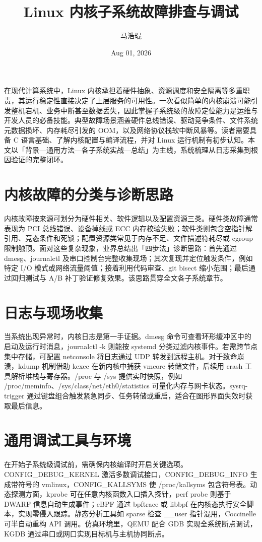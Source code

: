 \title{Linux 内核子系统故障排查与调试}
\author{马浩琨}
\date{Aug 01, 2026}
\maketitle
在现代计算系统中，Linux 内核承担着硬件抽象、资源调度和安全隔离等多重职责，其运行稳定性直接决定了上层服务的可用性。一次看似简单的内核崩溃可能引发整机宕机、业务中断甚至数据丢失，因此掌握子系统级的故障定位能力是运维与开发人员的必备技能。典型故障场景涵盖硬件总线错误、驱动竞争条件、文件系统元数据损坏、内存耗尽引发的 OOM，以及网络协议栈软中断风暴等。读者需要具备 C 语言基础、了解内核配置与编译流程，并对 Linux 运行机制有初步认知。本文以「背景—通用方法—各子系统实战—总结」为主线，系统梳理从日志采集到根因验证的完整闭环。\par
\chapter{内核故障的分类与诊断思路}
内核故障按来源可划分为硬件相关、软件逻辑以及配置资源三类。硬件类故障通常表现为 PCI 总线错误、设备掉线或 ECC 内存校验失败；软件类则包含空指针解引用、竞态条件和死锁；配置资源类常见于内存不足、文件描述符耗尽或 cgroup 限制触顶。面对这些复杂现象，业界总结出「四步法」诊断思路：首先通过 dmesg、journalctl 及串口控制台完整收集现场；其次复现并定位触发条件，例如特定 I/O 模式或网络流量阈值；接着利用代码审查、git bisect 缩小范围；最后通过回归测试与 A/B 补丁验证修复效果。该思路贯穿全文各子系统章节。\par
\chapter{日志与现场收集}
当系统出现异常时，内核日志是第一手证据。dmesg 命令可查看环形缓冲区中的启动及运行时消息，journalctl -k 则能按 systemd 分类过滤内核事件。若需跨节点集中存储，可配置 netconsole 将日志通过 UDP 转发到远程主机。对于致命崩溃，kdump 机制借助 kexec 在新内核中捕获 vmcore 转储文件，后续用 crash 工具解析堆栈与寄存器。/proc 与 /sys 提供实时快照，例如 /proc/meminfo、/sys/class/net/eth0/statistics 可量化内存与网卡状态。sysrq-trigger 通过键盘组合触发紧急同步、任务转储或重启，适合在图形界面失效时获取最后信息。\par
\chapter{通用调试工具与环境}
在开始子系统级调试前，需确保内核编译时开启关键选项。CONFIG\_{}DEBUG\_{}KERNEL 激活多数调试接口，CONFIG\_{}DEBUG\_{}INFO 生成带符号的 vmlinux，CONFIG\_{}KALLSYMS 使 /proc/kallsyms 包含符号表。动态探测方面，kprobe 可在任意内核函数入口插入探针，perf probe 则基于 DWARF 信息自动生成事件；eBPF 通过 bpftrace 或 libbpf 在内核态执行安全脚本，实现零侵入跟踪。静态分析工具如 sparse 检查 \_{}\_{}user 指针混用，Coccinelle 可半自动重构 API 调用。仿真环境里，QEMU 配合 GDB 实现全系统断点调试，KGDB 通过串口或网口实现目标机与主机协同断点。\par
